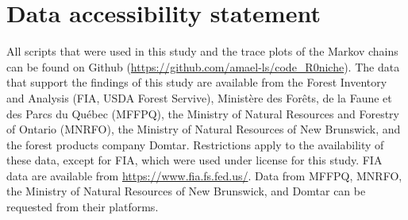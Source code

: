 \section{Data accessibility statement}
All scripts that were used in this study and the trace plots of the Markov chains can be found on Github (\url{https://github.com/amael-ls/code_R0niche}). The data that support the findings of this study are available from the Forest Inventory and Analysis (FIA, USDA Forest Servive), Ministère des Forêts, de la Faune et des Parcs du Québec (MFFPQ), the Ministry of Natural Resources and Forestry of Ontario (MNRFO), the Ministry of Natural Resources of New Brunswick, and the forest products company Domtar. Restrictions apply to the availability of these data, except for FIA, which were used under license for this study. FIA data are available from \url{https://www.fia.fs.fed.us/}. Data from MFFPQ, MNRFO, the Ministry of Natural Resources of New Brunswick, and Domtar can be requested from their platforms.
